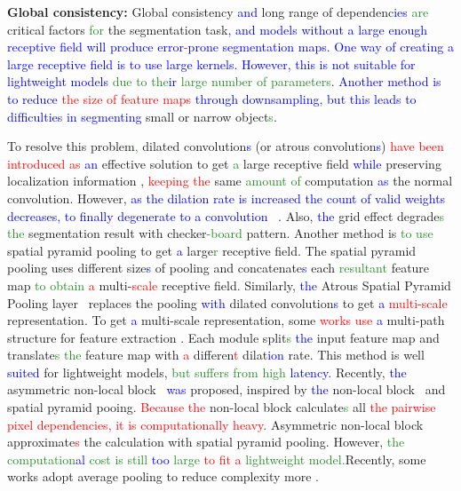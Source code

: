 \documentclass[10pt,twocolumn,letterpaper]{article}
\newcommand\Lars[1]{\textcolor{blue}{#1}}
\newcommand\yj[1]{\textcolor{ForestGreen}{#1}}
\newcommand\nj[1]{\textcolor{red}{#1}}
\newcommand\Lars[1]{#1}
\newcommand\yj[1]{#1}
\newcommand\nj[1]{#1}
\begin{document}
\noindent
\textbf{Global consistency:} 
Global consistency \Lars{and} long range of dependenc\Lars{ies} \yj{are} critical factors \yj{for} the segmentation task\Lars{, and models without a large enough receptive field will produce error\nj{-}prone segmentation maps. }\Lars{One way of creating a large receptive field is to use large kernels. However, this is not suitable for lightweight models}
\yj{due to the\Lars{ir} large number of parameters}.
\Lars{Another method is to reduce \nj{the size of feature maps} through downsampling, but this leads to difficulties in segmenting} small or narrow object\yj{s}. 

To resolve this problem\yj{,} dilated convolution\Lars{s} (or atrous convolution\Lars{s})
\nj{have been introduced as} \Lars{an} effective solution to get \yj{a} large receptive field \Lars{while} preserving localization information \cite{yu2015multi, chen2018deeplab}, \nj{keeping the} same \yj{amount of} computation \Lars{as} the normal convolution.
However, \Lars{as the dilation rate is increased the count of valid weights decreases, to finally degenerate to a  convolution~ \cite{chen2017rethinking}. }Also, \Lars{the} grid effect degrade\yj{s the} segmentation result with checker\yj{-board} pattern.
Another method is \yj{to use} spatial pyramid pooling to get \Lars{a} large\yj{r} receptive field.
The spatial pyramid pooling uses different size\Lars{s} of pooling and concatenate\Lars{s} each \yj{resultant} feature map \yj{to obtain}  \nj{a} multi-\nj{scale} receptive field.
Similarly, \Lars{the} Atrous Spatial Pyramid Pooling layer~\cite{deeplabv3plus2018} replaces the pooling \Lars{with} dilated convolution\Lars{s} to get \Lars{a} \nj{multi-scale} representation. 
To get \Lars{a} multi-scale representation, some \nj{works use} \Lars{a} multi-path structure for feature extraction \cite{mehta2018espnet, mehta2018espnetv2, park2018concentrated}.
Each module split\yj{s} \Lars{the} input feature map and translate\yj{s the} feature map with \nj{a} differen\nj{t} dilat\Lars{ion} rate. 
This method is well \Lars{suited} for lightweight models, \yj{but suffers from high \Lars{latency. }}Recently, \Lars{the} asymmetric non-local block~\cite{zhu2019asymmetric} \Lars{was} proposed, inspired by \Lars{the} non-local block~\cite{wang2018non} and spatial pyramid pooing.
\nj{Because the} non-local block calculate\yj{s} all \nj{the pairwise pixel dependencies, it is computationally heavy}.
Asymmetric non-local block approximate\nj{s} the calculation with spatial pyramid pooling. However, \yj{the computation\Lars{al} cost is still \Lars{too} large \nj{to fit a} lightweight model.}Recently, some works adopt average pooling to reduce complexity more \cite{wang2019elastic, li2019hbonet}.
\end{document}
